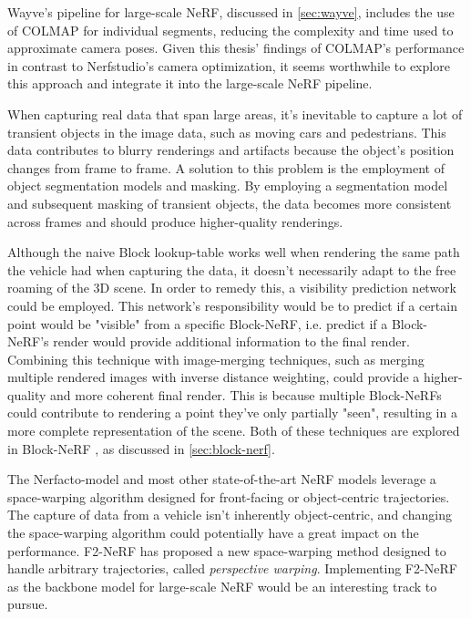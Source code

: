 Wayve's pipeline for large-scale NeRF, discussed in \autoref{sec:wayve}, includes the use of COLMAP for individual segments, reducing the complexity and time used to approximate camera poses. Given this thesis' findings of COLMAP's performance in contrast to Nerfstudio's camera optimization, it seems worthwhile to explore this approach and integrate it into the large-scale NeRF pipeline.

When capturing real data that span large areas, it's inevitable to capture a lot of transient objects in the image data, such as moving cars and pedestrians. This data contributes to blurry renderings and artifacts because the object's position changes from frame to frame. A solution to this problem is the employment of object segmentation models and masking. By employing a segmentation model and subsequent masking of transient objects, the data becomes more consistent across frames and should produce higher-quality renderings.

Although the naive Block lookup-table works well when rendering the same path the vehicle had when capturing the data, it doesn't necessarily adapt to the free roaming of the 3D scene. In order to remedy this, a visibility prediction network could be employed. This network's responsibility would be to predict if a certain point would be "visible" from a specific Block-NeRF, i.e. predict if a Block-NeRF's render would provide additional information to the final render. Combining this technique with image-merging techniques, such as merging multiple rendered images with inverse distance weighting, could provide a higher-quality and more coherent final render. This is because multiple Block-NeRFs could contribute to rendering a point they've only partially "seen", resulting in a more complete representation of the scene. Both of these techniques are explored in Block-NeRF \cite{tancik_block-nerf_2022}, as discussed in \autoref{sec:block-nerf}.

The Nerfacto-model and most other state-of-the-art NeRF models leverage a space-warping algorithm designed for front-facing or object-centric trajectories. The capture of data from a vehicle isn't inherently object-centric, and changing the space-warping algorithm could potentially have a great impact on the performance. F2-NeRF \cite{wang_f2-nerf_2023} has proposed a new space-warping method designed to handle arbitrary trajectories, called \textit{perspective warping}. Implementing F2-NeRF as the backbone model for large-scale NeRF would be an interesting track to pursue.





